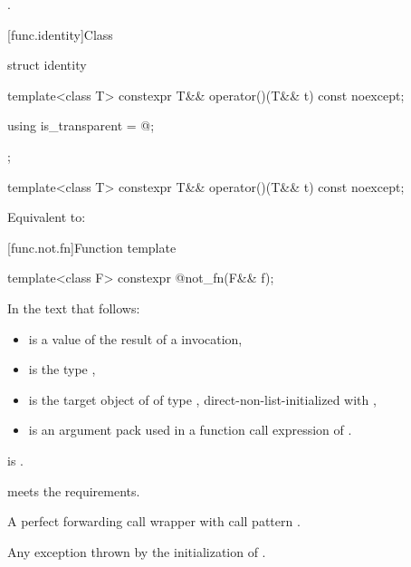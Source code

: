 \begin{itemdescr}
\pnum
\returns
{}.
\end{itemdescr}


[func.identity]{Class }

%
\begin{itemdecl}
struct identity {
  template<class T>
    constexpr T&& operator()(T&& t) const noexcept;

  using is_transparent = @\unspec@;
};

template<class T>
  constexpr T&& operator()(T&& t) const noexcept;
\end{itemdecl}

\begin{itemdescr}
\pnum
\effects
Equivalent to: 
\end{itemdescr}


[func.not.fn]{Function template }

%
\begin{itemdecl}
template<class F> constexpr @\unspec@ not_fn(F&& f);
\end{itemdecl}

\begin{itemdescr}
\pnum
In the text that follows:
\begin{itemize}
\item {} is a value of the result of a  invocation,
\item {} is the type ,
\item {} is the target object of 
  of type ,
  direct-non-list-initialized with ,
\item {} is an argument pack
  used in a function call expression of .
\end{itemize}

\pnum
\mandates
{}
is .

\pnum
\expects
{} meets the  requirements.

\pnum
\returns
A perfect forwarding call wrapper 
with call pattern .

\pnum
\throws
Any exception thrown by the initialization of .
\end{itemdescr}

